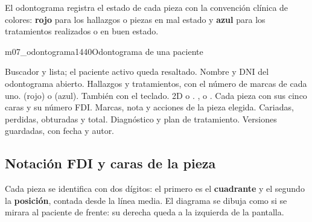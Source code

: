 \documentclass[11pt]{article}
\begin{document}
\label{sec:odontograma}


El odontograma registra el estado de cada pieza con la convención clínica de colores: \textcolor{sdred}{\textbf{rojo}} para los hallazgos o piezas en mal estado y \textcolor{sdblue}{\textbf{azul}} para los tratamientos realizados o en buen estado.

\begin{pantalla}{m07_odontograma}{1440}{Odontograma de una paciente}
\end{pantalla}

\begin{leyenda}
   Buscador y lista; el paciente activo queda resaltado.
   Nombre y DNI del odontograma abierto.
   Hallazgos y tratamientos, con el número de marcas de cada uno.
    (rojo) o  (azul).
   También con el teclado.
    2D o .
   ,  o .
   Cada pieza con sus cinco caras y su número FDI.
   Marcas, nota y acciones de la pieza elegida.
   Cariadas, perdidas, obturadas y total.
   Diagnóstico y plan de tratamiento.
   Versiones guardadas, con fecha y autor.
\end{leyenda}

\subsection{Notación FDI y caras de la pieza}

Cada pieza se identifica con dos dígitos: el primero es el \textbf{cuadrante} y el segundo la \textbf{posición}, contada desde la línea media. El diagrama se dibuja como si se mirara al paciente de frente: su derecha queda a la izquierda de la pantalla.
\end{document}
